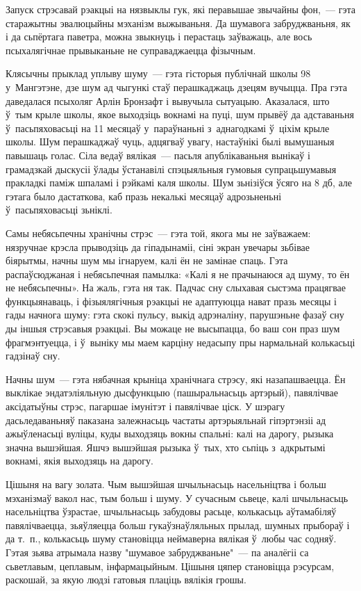 Запуск стрэсавай рэакцыі на нязвыклы гук, які перавышае звычайны фон,~--- гэта старажытны эвалюцыйны мэханізм выжываньня. Да шумавога забруджваньня, як і да сьпёртага паветра, можна звыкнуць і перастаць заўважаць, але вось псыхалягічнае прывыканьне не суправаджаецца фізычным.

Клясычны прыклад уплыву шуму~--- гэта гісторыя публічнай школы 98 у~Мангэтэне, дзе шум ад чыгункі стаў перашкаджаць дзецям вучыцца. Пра гэта даведалася псыхоляг Арлін Бронзафт і вывучыла сытуацыю. Аказалася, што ў~тым крыле школы, якое выходзіць вокнамі на пуці, шум прывёў да адставаньня ў~пасьпяховасьці на 11 месяцаў у~параўнаньні з~аднагодкамі ў~ціхім крыле школы. Шум перашкаджаў чуць, адцягваў увагу, настаўнікі былі вымушаныя павышаць голас. Сіла ведаў вялікая~--- пасьля апублікаваньня вынікаў і грамадзкай дыскусіі ўлады ўстанавілі спэцыяльныя гумовыя супрацьшумавыя пракладкі паміж шпаламі і рэйкамі каля школы. Шум зьнізіўся ўсяго на 8 дб, але гэтага было дастаткова, каб празь некалькі месяцаў адрозьненьні ў~пасьпяховасьці зьніклі.

Самы небясьпечны хранічны стрэс~--- гэта той, якога мы не заўважаем: нязручнае крэсла прыводзіць да гіпадынаміі, сіні экран увечары зьбівае біярытмы, начны шум мы ігнаруем, калі ён не замінае спаць. Гэта распаўсюджаная і небясьпечная памылка: «Калі я не прачынаюся ад шуму, то ён не небясьпечны». На жаль, гэта ня так. Падчас сну слыхавая сыстэма працягвае функцыянаваць, і фізыялягічныя рэакцыі не адаптуюцца нават празь месяцы і гады начнога шуму: гэта скокі пульсу, выкід адрэналіну, парушэньне фазаў сну ды іншыя стрэсавыя рэакцыі. Вы можаце не высыпацца, бо ваш сон праз шум фрагмэнтуецца, і ў~выніку мы маем карціну недасыпу пры нармальнай колькасьці гадзінаў сну.

Начны шум~--- гэта нябачная крыніца хранічнага стрэсу, які назапашваецца. Ён выклікае эндатэліяльную дысфункцыю (пашыральнасьць артэрый), павялічвае аксідатыўны стрэс, пагаршае імунітэт і павялічвае ціск. У шэрагу дасьледаваньняў паказана залежнасьць частаты артэрыяльнай гіпэртэнзіі ад ажыўленасьці вуліцы, куды выходзяць вокны спальні: калі на дарогу, рызыка значна вышэйшая. Яшчэ вышэйшая рызыка ў~тых, хто сьпіць з~адкрытымі вокнамі, якія выходзяць на дарогу.

Цішыня на вагу золата. Чым вышэйшая шчыльнасьць насельніцтва і больш мэханізмаў вакол нас, тым больш і шуму. У сучасным сьвеце, калі шчыльнасьць насельніцтва ўзрастае, шчыльнасьць забудовы расьце, колькасьць аўтамабіляў павялічваецца, зьяўляецца больш гукаўзнаўляльных прылад, шумных прыбораў і да т.~п., колькасьць шуму становіцца неймаверна вялікая ў~любы час содняў. Гэтая зьява атрымала назву "шумавое забруджваньне"~--- па аналёгіі са сьветлавым, цеплавым, інфармацыйным. Цішыня цяпер становіцца рэсурсам, раскошай, за якую людзі гатовыя плаціць вялікія грошы.

